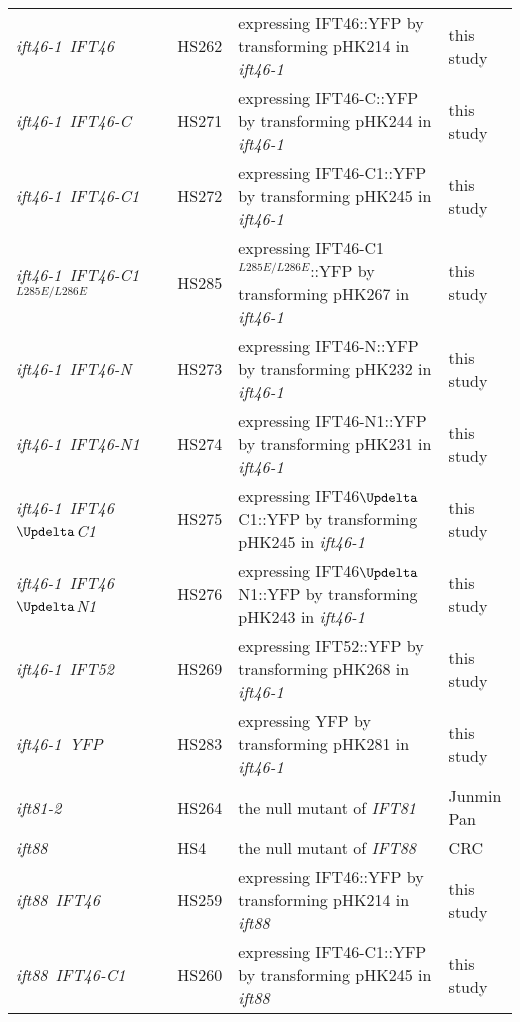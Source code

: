 \begin{longtable}{>{\hsize=0.4\hsize}Xl>{\hsize=0.65\hsize}Xl @{}}
\textit{ift46-1}\ \textit{IFT46} & HS262 & expressing IFT46::YFP by transforming pHK214 in \textit{ift46-1} & this study\\
\textit{ift46-1}\ \textit{IFT46-C} & HS271 & expressing IFT46-C::YFP by transforming pHK244 in \textit{ift46-1} & this study\\
\textit{ift46-1}\ \textit{IFT46-C1} & HS272 & expressing IFT46-C1::YFP by transforming pHK245 in \textit{ift46-1} & this study\\
\textit{ift46-1}\ \textit{IFT46-C1$^{L285E/L286E}$} & HS285 & expressing IFT46-C1$^{L285E/L286E}$::YFP by transforming pHK267 in \textit{ift46-1} & this study\\
\textit{ift46-1}\ \textit{IFT46-N} & HS273 & expressing IFT46-N::YFP by transforming pHK232 in \textit{ift46-1} & this study\\
\textit{ift46-1}\ \textit{IFT46-N1} & HS274 & expressing IFT46-N1::YFP by transforming pHK231 in \textit{ift46-1} & this study\\
\textit{ift46-1}\ \textit{IFT46$\Updelta$C1} & HS275 & expressing IFT46$\Updelta$C1::YFP by transforming pHK245 in \textit{ift46-1} & this study\\
\textit{ift46-1}\ \textit{IFT46$\Updelta$N1} & HS276 & expressing IFT46$\Updelta$N1::YFP by transforming pHK243 in \textit{ift46-1} & this study\\
\textit{ift46-1}\ \textit{IFT52} & HS269 & expressing IFT52::YFP by transforming pHK268 in \textit{ift46-1} & this study\\
\textit{ift46-1}\ \textit{YFP} & HS283 & expressing YFP by transforming pHK281 in \textit{ift46-1} & this study\\
\textit{ift81-2} & HS264 & the null mutant of \textit{IFT81} & Junmin Pan\\
\textit{ift88} & HS4 & the null mutant of \textit{IFT88} & CRC\\
\textit{ift88}\ \textit{IFT46} & HS259 & expressing IFT46::YFP by transforming pHK214 in \textit{ift88} & this study\\
\textit{ift88}\ \textit{IFT46-C1} & HS260 & expressing IFT46-C1::YFP by transforming pHK245 in \textit{ift88} & this study\\
\bottomrule
\end{longtable}